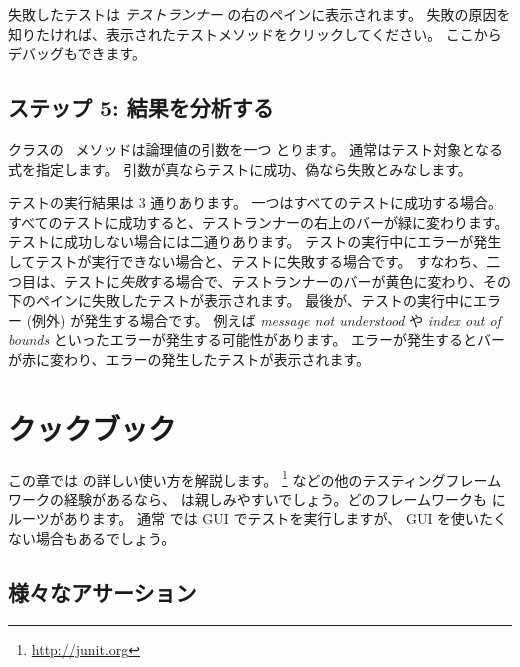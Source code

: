 \documentclass[a4paper,10pt,twoside]{book}
\begin{document}


失敗したテストは \emph{テストランナー} の右のペインに表示されます。
失敗の原因を知りたければ、表示されたテストメソッドをクリックしてください。
ここからデバッグもできます。

\subsection{ステップ 5: 結果を分析する}

 クラスの \ メソッドは論理値の引数を一つ
とります。
通常はテスト対象となる式を指定します。
引数が真ならテストに成功、偽なら失敗とみなします。


テストの実行結果は 3 通りあります。
一つはすべてのテストに成功する場合。
すべてのテストに成功すると、{テストランナー}の右上のバーが緑に変わります。
テストに成功しない場合には二通りあります。
テストの実行中にエラーが発生してテストが実行できない場合と、テストに失敗する場合です。
すなわち、二つ目は、テストに\emph{失敗}する場合で、{テストランナー}のバーが黄色に変わり、その下のペインに失敗したテストが表示されます。
最後が、テストの実行中にエラー (例外) が発生する場合です。
例えば \emph{message not understood} や \emph{index out of bounds} といったエラーが発生する可能性があります。
エラーが発生するとバーが赤に変わり、エラーの発生したテストが表示されます。


\section{\SUnit クックブック}

この章では \SUnit の詳しい使い方を解説します。
\JUnit\footnote{\url{http://junit.org}} などの他のテスティングフレームワークの経験があるなら、 \SUnit は親しみやすいでしょう。どのフレームワークも \SUnit にルーツがあります。
通常 \SUnit では GUI でテストを実行しますが、 GUI を使いたくない場合もあるでしょう。

\subsection{様々なアサーション}
\end{document}
